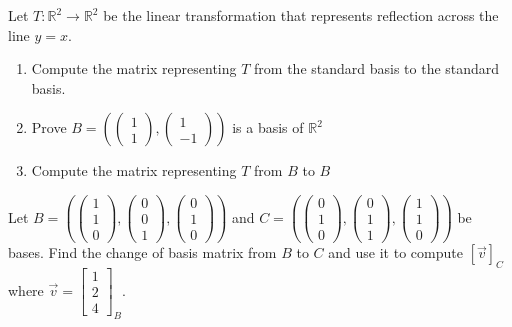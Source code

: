 \begin{exercise}
    Let $T:\mathbb{R}^2\to\mathbb{R}^2$ be the linear transformation that represents reflection across the line $y=x$.
    \begin{enumerate}[label=(\alph*)]
        \item Compute the matrix representing $T$ from the standard basis to the standard basis.
        \item Prove $B=\left(\begin{pmatrix}
            1 \\ 1
        \end{pmatrix}, \begin{pmatrix}
            1 \\ -1
        \end{pmatrix}\right)$ is a basis of $\mathbb{R}^2$
        \item  Compute the matrix representing $T$ from $B$ to $B$
    \end{enumerate}
\end{exercise}
\begin{exercise}
        Let $B=\left(\begin{pmatrix}
            1 \\ 1 \\ 0
        \end{pmatrix}, \begin{pmatrix}
            0 \\ 0 \\ 1
        \end{pmatrix}, \begin{pmatrix}
            0 \\ 1 \\ 0
        \end{pmatrix}\right)$ and $C=\left(\begin{pmatrix}
            0 \\ 1 \\ 0
        \end{pmatrix}, \begin{pmatrix}
            0 \\ 1 \\ 1
        \end{pmatrix}, \begin{pmatrix}
            1 \\ 1 \\ 0
        \end{pmatrix}\right)$ be bases. Find the change of basis matrix from $B$ to $C$ and use it to compute $[\vec{v}]_C$ where $\vec{v}=\begin{bmatrix}
            1 \\ 2 \\ 4
        \end{bmatrix}_B$.
\end{exercise}
